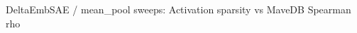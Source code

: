 \documentclass{article}
\begin{document}
\fontsize{13.0}{16.25}%
\ifdefined\psfrag\else\hbox{}\fi%
{\rmfamily DeltaEmbSAE / mean\_pool sweeps: Activation sparsity vs MaveDB Spearman rho}%
\end{document}
